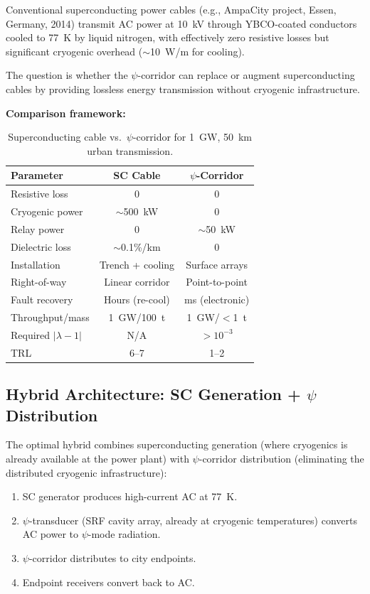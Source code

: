 \documentclass[aps,prd,twocolumn,superscriptaddress,nofootinbib]{revtex4-2}
\begin{document}
Conventional superconducting power cables (e.g., AmpaCity project,
Essen, Germany, 2014) transmit AC power at 10~kV through YBCO-coated
conductors cooled to 77~K by liquid nitrogen, with effectively zero
resistive losses but significant cryogenic overhead ($\sim$10~W/m
for cooling).

The question is whether the $\psi$-corridor can replace or augment
superconducting cables by providing lossless energy transmission
without cryogenic infrastructure.

\textbf{Comparison framework:}

\begin{table}[h]
\caption{Superconducting cable vs.\ $\psi$-corridor for 1~GW, 50~km
urban transmission.}
\label{tab:sc_vs_psi}
\begin{ruledtabular}
\begin{tabular}{lcc}
Parameter & SC Cable & $\psi$-Corridor \\
\hline
Resistive loss & 0 & 0 \\
Cryogenic power & $\sim$500~kW & 0 \\
Relay power & 0 & $\sim$50~kW \\
Dielectric loss & $\sim$0.1\%/km & 0 \\
Installation & Trench + cooling & Surface arrays \\
Right-of-way & Linear corridor & Point-to-point \\
Fault recovery & Hours (re-cool) & ms (electronic) \\
Throughput/mass & 1~GW/100~t & 1~GW/$<$1~t \\
Required $|\lambda-1|$ & N/A & $> 10^{-3}$ \\
TRL & 6--7 & 1--2 \\
\end{tabular}
\end{ruledtabular}
\end{table}

\subsection{Hybrid Architecture: SC Generation + $\psi$ Distribution}

The optimal hybrid combines superconducting generation (where
cryogenics is already available at the power plant) with
$\psi$-corridor distribution (eliminating the distributed cryogenic
infrastructure):

\begin{enumerate}
\item SC generator produces high-current AC at 77~K.
\item $\psi$-transducer (SRF cavity array, already at cryogenic
temperatures) converts AC power to $\psi$-mode radiation.
\item $\psi$-corridor distributes to city endpoints.
\item Endpoint receivers convert back to AC.
\end{enumerate}
\end{document}
